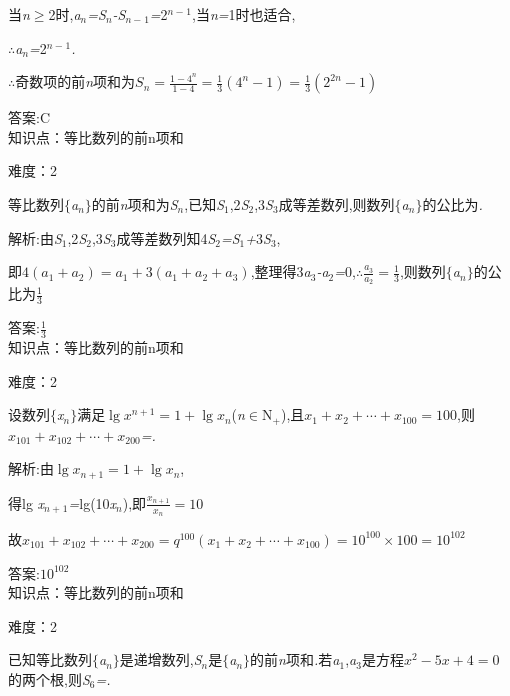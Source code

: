 \documentclass{article} %
\begin{document}
当\textit{n}$\mathrm{\ge}$2时,\textit{a${}_{n}$=S${}_{n}$-S${}_{n-}$}${}_{1}$\textit{=}2\textit{${}^{n-}$}${}^{1}$,当\textit{n=}1时也适合,

\textit{$\therefore$a${}_{n}$=}2\textit{${}^{n-}$}${}^{1}$\textit{.}

\textit{$\therefore$}奇数项的前\textit{n}项和为$S_n=\frac{1-4^n}{1-4}=\frac{1}{3}(4^n-1)=\frac{1}{3}(2^{2n}-1)$

 答案:C \\

知识点：等比数列的前n项和

难度：2

 等比数列$\mathrm{\{}$\textit{a${}_{n}$}$\mathrm{\}}$的前\textit{n}项和为\textit{S${}_{n}$},已知\textit{S}${}_{1}$,2\textit{S}${}_{2}$,3\textit{S}${}_{3}$成等差数列,则数列$\mathrm{\{}$\textit{a${}_{n}$}$\mathrm{\}}$的公比为\textit{\underbar{　　　　　}.~}

 解析:由\textit{S}${}_{1}$,2\textit{S}${}_{2}$,3\textit{S}${}_{3}$成等差数列知4\textit{S}${}_{2}$\textit{=S}${}_{1}$\textit{+}3\textit{S}${}_{3}$,

即$4(a_1+a_2)=a_1+3(a_1+a_2+a_3)$,整理得3\textit{a}${}_{3}$\textit{-a}${}_{2}$\textit{=}0,$\therefore \frac{a_3}{a_2}=\frac{1}{3}$,则数列$\mathrm{\{}$\textit{a${}_{n}$}$\mathrm{\}}$的公比为$\frac{1}{3}$

 答案:$\frac{1}{3}$ \\

知识点：等比数列的前n项和

难度：2

 设数列$\mathrm{\{}$\textit{x${}_{n}$}$\mathrm{\}}$满足$\lg x^{n+1}=1+\lg x_n$(\textit{n}$\mathrm{\in}$N\textit{${}_{+}$}),且$x_1+x_2+\cdots +x_{100}=100$,则$x_{101}+x_{102}+\cdots+x_{200}$\textit{=\underbar{　　　　　}.~}

 解析:由$\lg x_{n+1}=1+\lg x_n$,

得lg \textit{x${}_{n+}$}${}_{1}$\textit{=}lg(10\textit{x${}_{n}$}),即$\frac{x_{n+1}}{x_n}=10$

故$x_{101}+x_{102}+\cdots+x_{200}=q^{100}(x_1+x_2+\cdots+x_{100})=10^{100}\times 100=10^{102}$

 答案:$10^{102}$ \\

知识点：等比数列的前n项和

难度：2

 已知等比数列$\mathrm{\{}$\textit{a${}_{n}$}$\mathrm{\}}$是递增数列,\textit{S${}_{n}$}是$\mathrm{\{}$\textit{a${}_{n}$}$\mathrm{\}}$的前\textit{n}项和\textit{.}若\textit{a}${}_{1}$,\textit{a}${}_{3}$是方程$x^2-5x+4=0$的两个根,则\textit{S}${}_{6}$\textit{=\underbar{　　　　　}.~}
\end{document}
